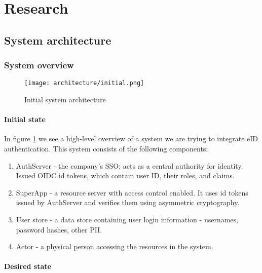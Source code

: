 \section{Research}


\subsection{System architecture}

\subsubsection{System overview}

\begin{figure}
  \centering
  \texttt{[image: architecture/initial.png]}
  \caption{Initial system architecture}
  \label{fig:sys-highlevel}
\end{figure}


\paragraph{Initial state}

In figure \ref{fig:sys-highlevel} we see a high-level overview of a system we are trying to integrate eID authentication. This system consists of the following components:

\begin{enumerate}
  \item AuthServer - the company's SSO; acts as a central authority for identity. Issued OIDC id tokens, which contain user ID, their roles, and claims.
  \item SuperApp - a resource server with access control enabled. It uses id tokens issued by AuthServer and verifies them using asymmetric cryptography.
  \item User store - a data store containing user login information - usernames, password hashes, other PII.
  \item Actor - a physical person accessing the resources in the system.
\end{enumerate}

\paragraph{Desired state}


